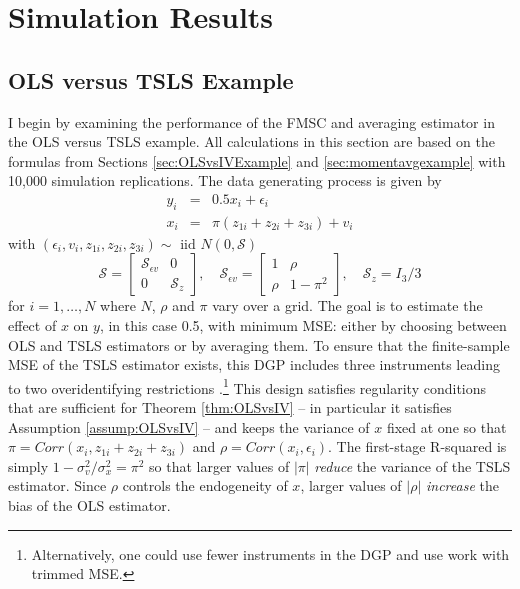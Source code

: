 \section{Simulation Results}
\label{sec:simulations}
\subsection{OLS versus TSLS Example}
\label{sec:OLSvsIVsim}
I begin by examining the performance of the FMSC and averaging estimator in the OLS versus TSLS example.
All calculations in this section are based on the formulas from Sections \ref{sec:OLSvsIVExample} and \ref{sec:momentavgexample} with 10,000 simulation replications. 
The data generating process is given by 
\begin{eqnarray}
	y_i &=& 0.5 x_i + \epsilon_i\\
	\label{eq:OLSvsIVDGP1}
	x_i &=& \pi(z_{1i} + z_{2i} + z_{3i}) + v_i
	\label{eq:OLSvsIVDGP2}
\end{eqnarray}
with $(\epsilon_i, v_i, z_{1i}, z_{2i}, z_{3i}) \sim \mbox{ iid } N(0, \mathcal{S})$
\begin{equation}
	\mathcal{S} = \left[ \begin{array}
		{cc} \mathcal{S}_{\epsilon v} & 0 \\ 0 & \mathcal{S}_z
	\end{array} \right], \quad 
	\mathcal{S}_{\epsilon v} = \left[ \begin{array}
		{cc} 1 & \rho \\ \rho & 1 - \pi^2 
	\end{array} \right], \quad \mathcal{S}_z = I_3 / 3
	\label{eq:OLSvsIVDGP3}
\end{equation}
for $i= 1, \hdots, N$ where $N$, $\rho$ and $\pi$ vary over a grid.
The goal is to estimate the effect of $x$ on $y$, in this case 0.5, with minimum MSE: either by choosing between OLS and TSLS estimators or by averaging them.
To ensure that the finite-sample MSE of the TSLS estimator exists, this DGP includes three instruments leading to two overidentifying restrictions \citep{Phillips1980}.\footnote{Alternatively, one could use fewer instruments in the DGP and use work with trimmed MSE.}
This design satisfies regularity conditions that are sufficient for Theorem \ref{thm:OLSvsIV} -- in particular it satisfies Assumption \ref{assump:OLSvsIV} -- and keeps the variance of $x$ fixed at one so that $\pi = Corr(x_i, z_{1i} + z_{2i} + z_{3i})$ and $\rho = Corr(x_i,\epsilon_i)$.
The first-stage R-squared is simply $1 - \sigma_v^2/\sigma_x^2 = \pi^2$ so that larger values of $|\pi|$ \emph{reduce} the variance of the TSLS estimator.
Since $\rho$ controls the endogeneity of $x$, larger values of $|\rho|$ \emph{increase} the bias of the OLS estimator.


